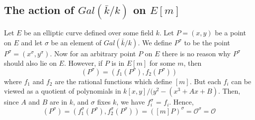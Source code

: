 

\subsection{The action of $Gal(\bar{k} / k)$ on $E[m]$}
\label{sec:action-of-Galois-on-m-torsion}

Let $E$ be an elliptic curve defined over some field $k$.  Let $P = (x,y)$ be a point
on $E$ and let $\sigma$ be an element of $Gal(\bar{k} / k)$.  We define $P^{\sigma}$
to be the point $P^{\sigma} = (x^{\sigma},y^{\sigma})$.  Now for an arbitrary point
$P$ on $E$ there is no reason why $P^{\sigma}$ should also lie on $E$. However, if
$P$ is in $E[m]$ for some $m$, then
\begin{equation*}
  [m](P^{\sigma}) = (f_{1}(P^{\sigma}),f_{2} (P^{\sigma}))
\end{equation*}
where $f_{1}$ and $f_{2}$ are the rational functions which define $[m]$.  But each
$f_{i}$ can be viewed as a quotient of polynomials in $k[x,y] / (y^{2} - (x^{3} + Ax
+ B)$.  Then, since $A$ and $B$ are in $k$, and $\sigma$ fixes $k$, we have
$f_{i}^{\sigma}$ = $f_{i}$.  Hence,
\begin{equation*}
  [m](P^{\sigma}) = (f_{1}^{\sigma}(P^{\sigma}),f_{2}^{\sigma}(P^{\sigma})) =
  ([m]P)^{\sigma} = \mathcal{O}^{\sigma} = \mathcal{O}
\end{equation*}

